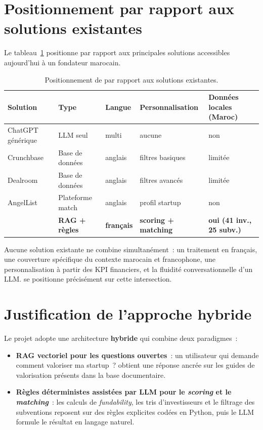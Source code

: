 \section{Positionnement par rapport aux solutions existantes}

Le tableau~\ref{tab:comparaison} positionne \tamwil{} par rapport aux principales solutions accessibles aujourd'hui à un fondateur marocain.

\begin{table}[H]
\centering
\caption{Positionnement de \tamwil{} par rapport aux solutions existantes.}
\label{tab:comparaison}
\small
\begin{tabularx}{\textwidth}{@{}l l l X X@{}}
\toprule
\textbf{Solution} & \textbf{Type} & \textbf{Langue} & \textbf{Personnalisation} & \textbf{Données locales (Maroc)} \\
\midrule
ChatGPT générique & \ac{LLM} seul     & multi            & aucune                       & non \\
Crunchbase        & Base de données   & anglais          & filtres basiques             & limitée \\
Dealroom          & Base de données   & anglais          & filtres avancés              & limitée \\
AngelList         & Plateforme match  & anglais          & profil startup               & non \\
\textbf{\tamwil{}} & \textbf{RAG + règles} & \textbf{français} & \textbf{scoring + matching} & \textbf{oui (41 inv., 25 subv.)} \\
\bottomrule
\end{tabularx}
\end{table}

Aucune solution existante ne combine simultanément~: un traitement en français, une couverture spécifique du contexte marocain et francophone, une personnalisation à partir des \ac{KPI} financiers, et la fluidité conversationnelle d'un \ac{LLM}. \tamwil{} se positionne précisément sur cette intersection.

\section{Justification de l'approche hybride}

Le projet adopte une architecture \textbf{hybride} qui combine deux paradigmes~:

\begin{itemize}
  \item \textbf{\ac{RAG} vectoriel pour les questions ouvertes}~: un utilisateur qui demande \og comment valoriser ma startup~? \fg{} obtient une réponse ancrée sur les guides de valorisation présents dans la base documentaire.
  \item \textbf{Règles déterministes assistées par \ac{LLM} pour le \textit{scoring} et le \textit{matching}}~: les calculs de \textit{fundability}, les tris d'investisseurs et le filtrage des subventions reposent sur des règles explicites codées en Python, puis le \ac{LLM} formule le résultat en langage naturel.
\end{itemize}

